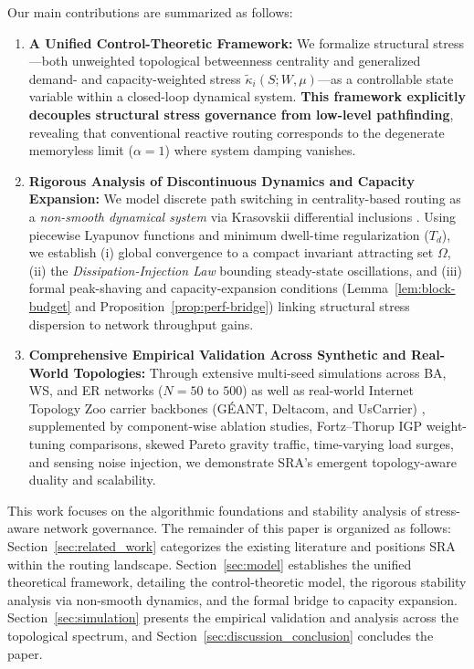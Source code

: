 \documentclass[journal]{IEEEtran}
\theoremstyle{plain}
\theoremstyle{definition}
\newcommand{\rev}[1]{{\color{blue}#1}}
\begin{document}
Our main contributions are summarized as follows:
\begin{enumerate}
    \item \textbf{A Unified Control-Theoretic Framework:} We formalize structural stress---both unweighted topological betweenness centrality and \rev{generalized demand- and capacity-weighted stress $\widetilde{\kappa}_i(S;W,\mu)$}---as a controllable state variable within a closed-loop dynamical system. \textbf{This framework explicitly decouples structural stress governance from low-level pathfinding}, revealing that conventional reactive routing corresponds to the degenerate memoryless limit ($\alpha=1$) where system damping vanishes.
    
    \item \textbf{Rigorous Analysis of Discontinuous Dynamics \rev{and Capacity Expansion}:} We model discrete path switching in centrality-based routing as a \textit{non-smooth dynamical system} via Krasovskii differential inclusions \cite{Aubin1984Differential}. Using piecewise Lyapunov functions and minimum dwell-time regularization ($T_d$), we establish (i) global convergence to a compact invariant attracting set $\Omega$, (ii) the \textit{Dissipation-Injection Law} bounding steady-state oscillations, and (iii) \rev{formal peak-shaving and capacity-expansion conditions (Lemma~\ref{lem:block-budget} and Proposition~\ref{prop:perf-bridge}) linking structural stress dispersion to network throughput gains}.
    
    \item \textbf{Comprehensive Empirical Validation \rev{Across Synthetic and Real-World Topologies}:} Through extensive multi-seed simulations across BA, WS, and ER networks ($N=50$ to $500$) as well as \rev{real-world Internet Topology Zoo carrier backbones (G\'EANT, Deltacom, and UsCarrier) \cite{Knight2011TopologyZoo}}, supplemented by \rev{component-wise ablation studies, Fortz--Thorup IGP weight-tuning comparisons, skewed Pareto gravity traffic, time-varying load surges, and sensing noise injection}, we demonstrate SRA's emergent topology-aware duality and scalability.
\end{enumerate}

This work focuses on the algorithmic foundations and stability analysis of stress-aware network governance. The remainder of this paper is organized as follows: Section~\ref{sec:related_work} categorizes the existing literature and positions SRA within the routing landscape. 
Section~\ref{sec:model} establishes the unified theoretical framework, detailing the control-theoretic model, the rigorous stability analysis via non-smooth dynamics, and the formal bridge to capacity expansion. 
Section~\ref{sec:simulation} presents the empirical validation and analysis across the topological spectrum, and Section~\ref{sec:discussion_conclusion} concludes the paper.
\end{document}

